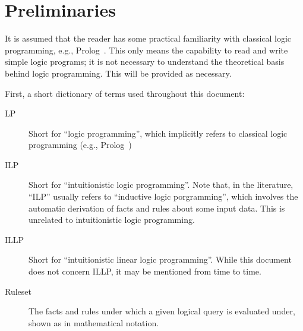 \section{Preliminaries}

It is assumed that the reader has some practical familiarity with classical logic programming, e.g., Prolog~\cite{roussel1975prolog, Warren:1977:PLI:872736.806939}.
This only means the capability to read and write simple logic programs; it is not necessary to understand the theoretical basis behind logic programming.
This will be provided as necessary.

First, a short dictionary of terms used throughout this document:

\begin{description}
  \item[LP] Short for ``logic programming'', which implicitly refers to classical logic programming (e.g., Prolog~\cite{roussel1975prolog, Warren:1977:PLI:872736.806939})

  \item[ILP] Short for ``intuitionistic logic programming''.
    Note that, in the literature, ``ILP'' usually refers to ``inductive logic porgramming'', which involves the automatic derivation of facts and rules about some input data.
    This is unrelated to intuitionistic logic programming.

  \item[ILLP] Short for ``intuitionistic linear logic programming''.
    While this document does not concern ILLP, it may be mentioned from time to time.

  \item[Ruleset] The facts and rules under which a given logical query is evaluated under, shown as  in mathematical notation.
\end{description}

